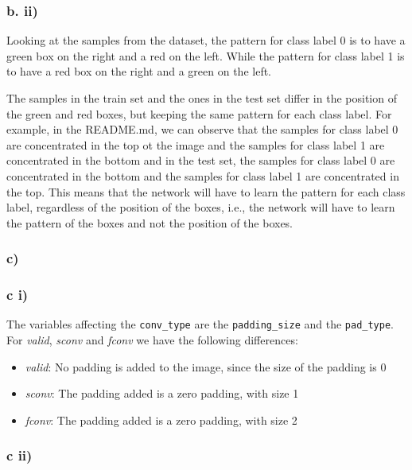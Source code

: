 \documentclass{article}
\begin{document}
\subsubsection*{b. ii)}
Looking at the samples from the dataset, the pattern for class label 0 is to have a green box on the right and a red on the left.
While the pattern for class label 1 is to have a red box on the right and a green on the left.

The samples in the train set and the ones in the test set differ in the position of the green and red boxes, but
keeping the same pattern for each class label. For example, in the README.md, we can observe that the samples for
class label 0 are concentrated in the top ot the image and the samples for class label 1 are concentrated in the bottom
and in the test set, the samples for class label 0 are concentrated in the bottom and the samples for class label 1 are
concentrated in the top.
This means that the network will have to learn the pattern for each class label, regardless of the position of the boxes, 
i.e., the network will have to learn the pattern of the boxes and not the position of the boxes.

\subsubsection*{c)}

\subsubsection*{c i)}


The variables affecting the \texttt{conv\_type} are the \texttt{padding\_size} and the \texttt{pad\_type}.
For \textit{valid}, \textit{sconv} and \textit{fconv} we have the following differences:

\begin{itemize}
    \item \textit{valid}: No padding is added to the image, since the size of the padding is 0
    \item \textit{sconv}: The padding added is a zero padding, with size 1
    \item \textit{fconv}: The padding added is a zero padding, with size 2
\end{itemize}

\subsubsection*{c ii)}
\end{document}
